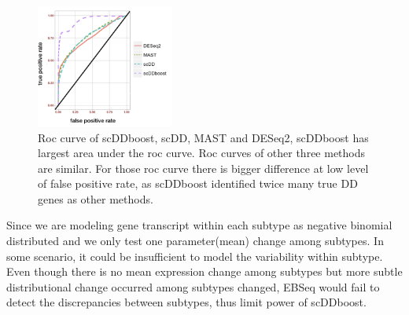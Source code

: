 \documentclass[11pt]{amsart}
\begin{document}
\begin{figure}[H]
  \includegraphics[width = 0.4\textwidth]{roc.png}
  \caption{Roc curve of scDDboost, scDD, MAST and DESeq2, scDDboost has largest area under the roc curve. Roc curves of other three methods are similar. For those roc curve there is bigger difference at low level of false positive rate, as scDDboost identified twice many true DD genes as other methods.}
  \label{fig:5}
\end{figure}

Since we are modeling gene transcript within each subtype as negative binomial distributed and we only test one parameter(mean) change among subtypes. In some scenario, it could be insufficient to model the variability within subtype. Even though there is no mean expression change among subtypes but more subtle distributional change occurred among subtypes changed, EBSeq would fail to detect the discrepancies between subtypes, thus limit power of scDDboost.\\
\newpage
\end{document}
